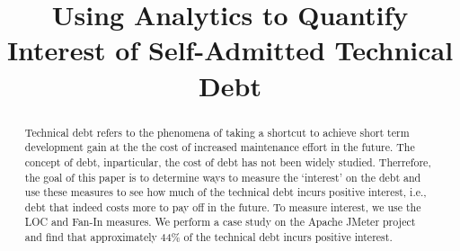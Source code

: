 \documentclass[conference]{IEEEtran}
\begin{document}
\title{Using Analytics to Quantify Interest of Self-Admitted Technical Debt}

\author{
}

\maketitle

\begin{abstract}
Technical debt refers to the phenomena of taking a shortcut to achieve short term development gain at the the cost of increased maintenance effort in the future. The concept of debt, inparticular, the cost of debt has not been widely studied. Therrefore, the goal of this paper is to determine ways to measure the `interest' on the debt and use these measures to see how much of the technical debt incurs positive interest, i.e., debt that indeed costs more to pay off in the future. To measure interest, we use the LOC and Fan-In measures. We perform a case study on the Apache JMeter project and find that approximately 44\% of the technical debt incurs positive interest.
\end{abstract}

\IEEEpeerreviewmaketitle

\begin{comment}
2 tomato: let's finish results (how to show)
2 tomato: read related work to get knowledge and good motivation for RQ1 and RQ2.

- slide:
2 tomato (one topic of current)
2 tomato (one topic of current)
\end{comment}
\end{document}
